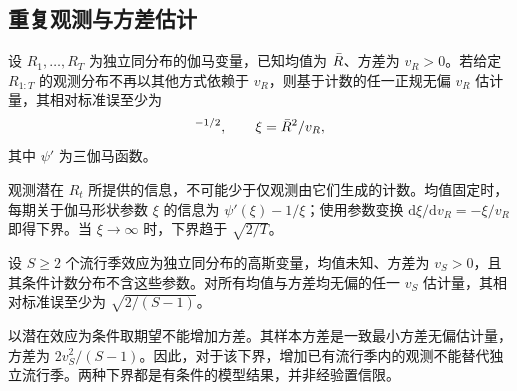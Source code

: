 \subsection{重复观测与方差估计}
\label{app:vr-precision}
\label{app:seasons}

\begin{proposition}[过程方差的条件信息下界]
\label{prop:vr-precision}
设 $R_1,\ldots,R_T$ 为独立同分布的伽马变量，已知均值为 $\bar R$、方差为 $v_R>0$。若给定 $R_{1:T}$ 的观测分布不再以其他方式依赖于 $v_R$，则基于计数的任一正规无偏 $v_R$ 估计量，其相对标准误至少为
\begin{equation}
 [T\xi(\xi\psi'(\xi)-1)]^{-1/2},\qquad \xi=\Rbar^2/v_R,
 \label{eq:vr-bound}
\end{equation}
其中 $\psi'$ 为三伽马函数。
\end{proposition}

观测潜在 $R_t$ 所提供的信息，不可能少于仅观测由它们生成的计数。均值固定时，每期关于伽马形状参数 $\xi$ 的信息为 $\psi'(\xi)-1/\xi$；使用参数变换 $\mathrm d\xi/\mathrm dv_R=-\xi/v_R$ 即得下界。当 $\xi\to\infty$ 时，下界趋于 $\sqrt{2/T}$。

\begin{corollary}[独立流行季效应]
\label{cor:season}
设 $S\ge2$ 个流行季效应为独立同分布的高斯变量，均值未知、方差为 $v_S>0$，且其条件计数分布不含这些参数。对所有均值与方差均无偏的任一 $v_S$ 估计量，其相对标准误至少为 $\sqrt{2/(S-1)}$。
\end{corollary}

以潜在效应为条件取期望不能增加方差。其样本方差是一致最小方差无偏估计量，方差为 $2v_S^2/(S-1)$\citep{lehmann1998theory, searle1992variance}。因此，对于该下界，增加已有流行季内的观测不能替代独立流行季。两种下界都是有条件的模型结果，并非经验置信限。

\FloatBarrier
\clearpage
\renewcommand{\thetable}{S\arabic{table}}
\setcounter{table}{0}
\renewcommand{\thefigure}{S\arabic{figure}}
\setcounter{figure}{0}

